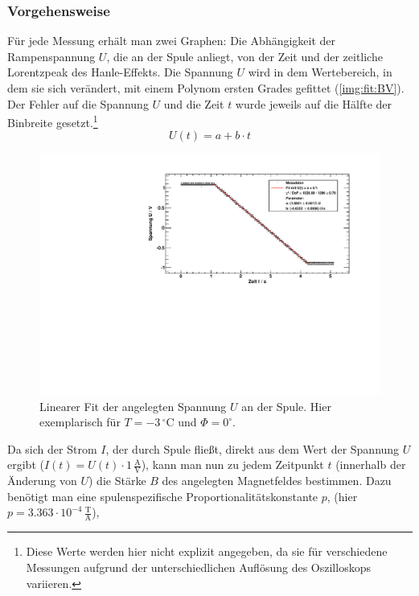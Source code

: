 \subsubsection{Vorgehensweise}
Für jede Messung erhält man zwei Graphen: Die Abhängigkeit der Rampenspannung $U$, die an der Spule anliegt, von der Zeit und der 
zeitliche Lorentzpeak des Hanle-Effekts. Die Spannung $U$ wird in dem Wertebereich, in dem sie sich verändert, mit 
einem Polynom ersten Grades gefittet (\autoref{img:fit:BV}). Der Fehler auf die Spannung $U$ und die Zeit $t$ wurde jeweils auf die Hälfte der 
Binbreite gesetzt.\footnote{Diese Werte werden hier nicht explizit angegeben, da sie für verschiedene Messungen aufgrund der unterschiedlichen 
Auflösung des Oszilloskops variieren.}
\begin{equation}
  \label{eq:BV:fitfunction}
  U(t) = a + b \cdot t
\end{equation}
\begin{figure}[H]
\begin{center}
  \includegraphics[width=\textwidth]{../img/fitBV_00_m03.pdf}
  \caption{Linearer Fit der angelegten Spannung $U$ an der Spule. Hier exemplarisch für $T=-3\,{}^\circ$C und $\Phi=0^\circ$.}
  \label{img:fit:BV}
\end{center}
\end{figure}
Da sich der Strom $I$, der durch Spule fließt, direkt aus dem Wert der Spannung $U$ ergibt ($I(t) = U(t) \cdot 1\,\frac{\text{A}}{\text{V}}$), kann man nun zu 
jedem Zeitpunkt $t$ (innerhalb der Änderung von $U$) die Stärke $B$ des angelegten Magnetfeldes bestimmen. Dazu benötigt man eine spulenspezifische 
Proportionalitätskonstante $p$, (hier $p=3.363\cdot10^{-4}\,\frac{\text{T}}{\text{A}}$), 
